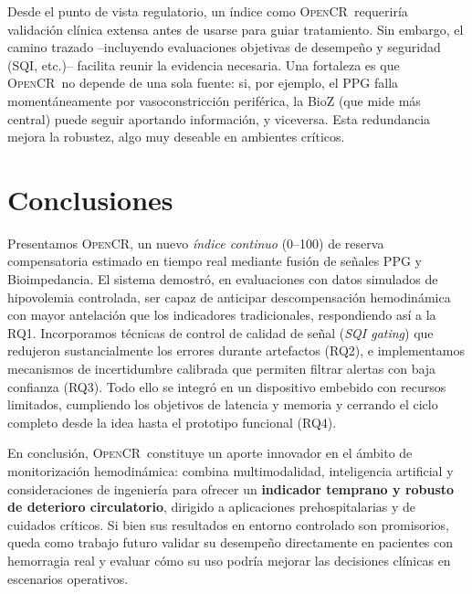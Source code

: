 \documentclass[10pt,a4paper,twocolumn]{article}
\newcommand{\OpenCR}{\textsc{OpenCR}}
\begin{document}
Desde el punto de vista regulatorio, un \'indice como \OpenCR\ requerir\'ia validaci\'on cl\'inica extensa antes de usarse para guiar tratamiento. Sin embargo, el camino trazado --incluyendo evaluaciones objetivas de desempe\~no y seguridad (SQI, etc.)-- facilita reunir la evidencia necesaria. Una fortaleza es que \OpenCR\ no depende de una sola fuente: si, por ejemplo, el PPG falla moment\'aneamente por vasoconstricci\'on perif\'erica, la BioZ (que mide m\'as central) puede seguir aportando informaci\'on, y viceversa. Esta redundancia mejora la robustez, algo muy deseable en ambientes cr\'iticos.
\section{Conclusiones}

Presentamos \OpenCR, un nuevo \emph{\'indice continuo} (0--100) de reserva compensatoria estimado en tiempo real mediante fusi\'on de se\~nales PPG y Bioimpedancia. El sistema demostr\'o, en evaluaciones con datos simulados de hipovolemia controlada, ser capaz de anticipar descompensaci\'on hemodin\'amica con mayor antelaci\'on que los indicadores tradicionales, respondiendo as\'i a la RQ1. Incorporamos t\'ecnicas de control de calidad de se\~nal (\emph{SQI gating}) que redujeron sustancialmente los errores durante artefactos (RQ2), e implementamos mecanismos de incertidumbre calibrada que permiten filtrar alertas con baja confianza (RQ3). Todo ello se integr\'o en un dispositivo embebido con recursos limitados, cumpliendo los objetivos de latencia y memoria y cerrando el ciclo completo desde la idea hasta el prototipo funcional (RQ4). 

En conclusi\'on, \OpenCR\ constituye un aporte innovador en el \'ambito de monitorizaci\'on hemodin\'amica: combina multimodalidad, inteligencia artificial y consideraciones de ingenier\'ia para ofrecer un \textbf{indicador temprano y robusto de deterioro circulatorio}, dirigido a aplicaciones prehospitalarias y de cuidados cr\'iticos. Si bien sus resultados en entorno controlado son promisorios, queda como trabajo futuro validar su desempe\~no directamente en pacientes con hemorragia real y evaluar c\'omo su uso podr\'ia mejorar las decisiones cl\'inicas en escenarios operativos.



\end{document}
